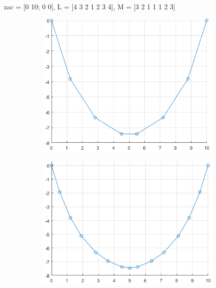\documentclass[A4paper, 11pt]{article}
\begin{document}
\newpage

zac = [0 10; 0 0], \quad L = [4 3 2 1 2 3 4], \quad M = [3 2 1 1 1 2 3]
\begin{figure}[h]
\begin{subfigure}{.5\textwidth}
\includegraphics[scale=0.5]{simetricna_liha_3}
\end{subfigure}
\begin{subfigure}{.5\textwidth}
\includegraphics[scale=0.5]{prepolovljena_3}
\end{subfigure}
\end{figure}
\end{document}
